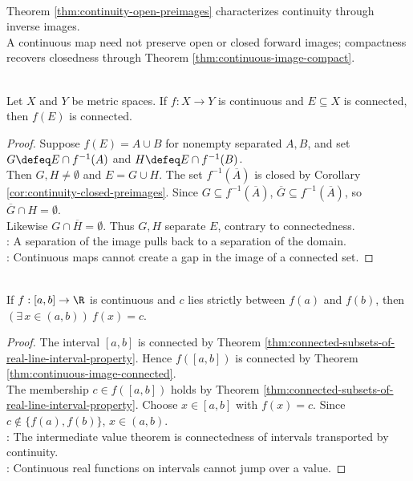 \begin{remark} \label{rem:continuity-controls-preimages-not-images} \\
Theorem \ref{thm:continuity-open-preimages} characterizes continuity through inverse images.\\
A continuous map need not preserve open or closed forward images; compactness recovers closedness through Theorem \ref{thm:continuous-image-compact}.
\end{remark}

\begin{theorem} \label{thm:continuous-image-connected} \\
Let $X$ and $Y$ be metric spaces. If $f:X\to Y$ is continuous and $E\subseteq X$ is connected, then $f(E)$ is connected.
\begin{proof}
Suppose $f(E)=A\cup B$ for nonempty separated $A,B$, and set $G\defeq E\cap f^{-1}(A)$ and $H\defeq E\cap f^{-1}(B)$.\\
Then $G,H\neq\emptyset$ and $E=G\cup H$. The set $f^{-1}(\overline{A})$ is closed by Corollary \ref{cor:continuity-closed-preimages}. Since $G\subseteq f^{-1}(\overline{A})$, $\overline{G}\subseteq f^{-1}(\overline{A})$, so $\overline{G}\cap H=\emptyset$.\\
Likewise $G\cap\overline{H}=\emptyset$. Thus $G,H$ separate $E$, contrary to connectedness.\\
: A separation of the image pulls back to a separation of the domain.\\
: Continuous maps cannot create a gap in the image of a connected set.
\end{proof}
\end{theorem}

\begin{theorem} \label{thm:intermediate-value-theorem} \\
If $f:[a,b]\to\R$ is continuous and $c$ lies strictly between $f(a)$ and $f(b)$, then $(\exists\,x\in(a,b))\ f(x)=c$.
\begin{proof}
The interval $[a,b]$ is connected by Theorem \ref{thm:connected-subsets-of-real-line-interval-property}. Hence $f([a,b])$ is connected by Theorem \ref{thm:continuous-image-connected}.\\
The membership $c\in f([a,b])$ holds by Theorem \ref{thm:connected-subsets-of-real-line-interval-property}. Choose $x\in[a,b]$ with $f(x)=c$. Since $c\notin\{f(a),f(b)\}$, $x\in(a,b)$.\\
: The intermediate value theorem is connectedness of intervals transported by continuity.\\
: Continuous real functions on intervals cannot jump over a value.
\end{proof}
\end{theorem}

